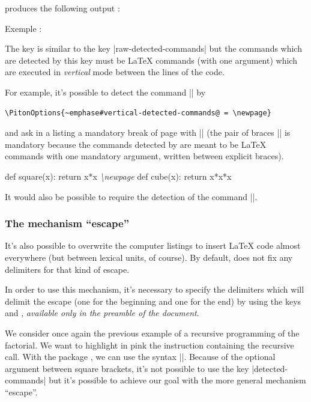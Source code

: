 \documentclass{article}
\begin{document}

produces the following output :

\smallskip
\begingroup
{}%
Exemple : 
\endgroup

\bigskip
The key  is similar to the key |raw-detected-commands|
but the commands which are detected by this key must be LaTeX commands (with one argument)
which are executed in \emph{vertical} mode between the lines of the code.

\smallskip
For example, it's possible to detect the command |\newpage| by

\begin{Verbatim}
\PitonOptions{~emphase#vertical-detected-commands@ = \newpage}
\end{Verbatim}

and ask in a listing a mandatory break of page with |\newpage{}| (the pair of braces |{}|
is mandatory because the commands detected by  are meant to be LaTeX commands
with one mandatory argument, written between explicit braces).

\begin{Code}
\begin{Piton}
def square(x):
    return x*x  \emph{\textbackslash{}newpage{}}
def cube(x):
    return x*x*x
\end{Piton}
\end{Code}

\medskip
It would also be possible to require the detection of the command |\vspace|.

\subsubsection{The mechanism ``escape''}

\label{escape}

It's also possible to overwrite the computer listings to insert LaTeX code
almost everywhere (but between lexical units, of course). By default,
 does not fix any delimiters for that kind of escape.

In order to use this mechanism, it's necessary to specify the delimiters which
will delimit the escape (one for the beginning and one for the end) by using
the keys  and , \emph{available only
in the preamble of the document}.

\medskip
We consider once again the previous example of a recursive programming of
the factorial. We want to highlight in pink the instruction containing the
recursive call. With the package , we can use the syntax
||. Because of the optional argument between square
brackets, it's not possible to use the key |detected-commands| but it's
possible to achieve our goal with the more general mechanism ``escape''.
\end{document}
